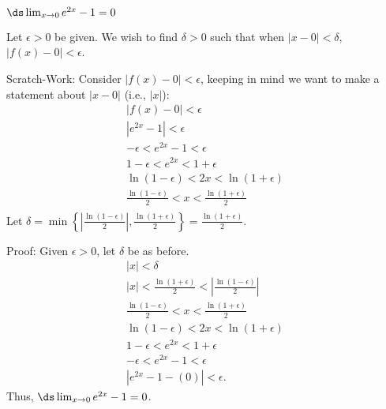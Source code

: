 {$\ds\lim_{x\to 0} e^{2x}-1 = 0$}
{Let $\epsilon >0$ be given. We wish to find $\delta >0$ such that when $|x-0|<\delta$, $|f(x)-0|<\epsilon$. 

Scratch-Work:
Consider $|f(x)-0|<\epsilon$, keeping in  mind we want to make a statement about $|x-0|$ (i.e., $|x|$):
\begin{gather*}
|f(x) -0 | < \epsilon \\
|e^{2x}-1 |<\epsilon \\
-\epsilon< e^{2x}-1 < \epsilon \\
1-\epsilon< e^{2x} < 1+\epsilon \\
\ln (1-\epsilon) < 2x < \ln (1+\epsilon) \\
\frac{\ln (1-\epsilon)}{2} < x < \frac{\ln (1+\epsilon)}{2} \\
\end{gather*}
Let $\delta = \min\left\{\left|\frac{\ln(1-\epsilon)}{2}\right|,\frac{\ln(1+\epsilon)}{2}\right\}=\frac{\ln(1+\epsilon)}{2}.$

Proof: Given $\epsilon>0$, let $\delta$ be as before.
\begin{gather*}
|x| < \delta \\
|x| <\frac{\ln(1+\epsilon)}{2}<\left|\frac{\ln(1-\epsilon)}{2}\right| \\
\frac{\ln(1-\epsilon)}{2} < x < \frac{\ln(1+\epsilon)}{2}\\
\ln(1-\epsilon)< 2x < \ln(1+\epsilon)\\
1-\epsilon < e^{2x} < 1+\epsilon\\
-\epsilon < e^{2x}-1 < \epsilon\\
|e^{2x}-1-(0)| < \epsilon.
\end{gather*}
Thus, $\ds\lim_{x\to 0} e^{2x}-1 = 0$.}




